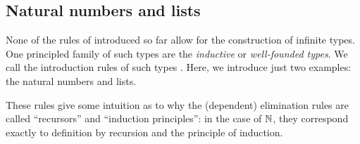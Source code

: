 \documentclass[./thesis.tex]{subfiles}
\begin{document}
\subsection{Natural numbers and lists}
\label{subsec:natural-numbers-and-lists}

None of the rules of \UTT{} introduced so far allow for the construction of
infinite types. One principled family of such types are the \textit{inductive}
or \textit{well-founded types}. We call the introduction rules of such types
. Here, we introduce just two examples: the
natural numbers and lists.


These rules give some intuition as to why the (dependent) elimination 
rules are called ``recursors'' and ``induction principles'': in the case of
$\mathbb{N}$, they correspond exactly to definition by recursion and the principle of
induction. 
\end{document}
